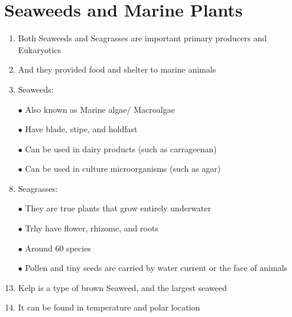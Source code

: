 \documentclass{report}
\begin{document}
\section{Seaweeds and Marine Plants}
\begin{enumerate}
    \item Both Seaweeds and Seagrasses are important primary producers and Eukaryotics
    \item And they provided food and shelter to marine animals
    \item Seaweeds:
    \item [$\bullet$]Also known as Marine algae/ Macroalgae
    \item [$\bullet$]Have blade, stipe, and holdfast
    \item [$\bullet$]Can be used in dairy products (such as carrageenan)
    \item [$\bullet$]Can be used in culture microorganisms (such as agar)
    \item Seagrasses: 
    \item [$\bullet$]They are true plants that grow entirely underwater
    \item [$\bullet$]Trhy have flower, rhizome, and roots
    \item [$\bullet$]Around 60 species
    \item [$\bullet$]Pollen and tiny seeds are carried by water current or the face of animals
    \item Kelp is a type of brown Seaweed, and the largest seaweed
    \item It can be found in temperature and polar location
\end{enumerate}
\end{document}
